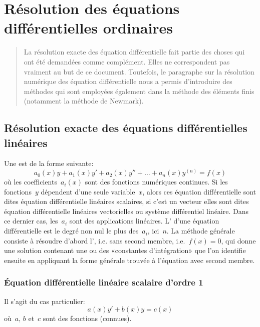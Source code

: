 \chapter{Résolution des équations différentielles ordinaires}\label{Ch-ED} 

\begin{abstract}
La résolution exacte des équation différentielle fait partie des choses qui ont été demandées comme complément. Elles ne correspondent pas vraiment au but de ce document. Toutefois, le paragraphe sur la résolution numérique des équation différentielle nous a permis d'introduire des méthodes qui sont employées également dans la méthode des éléments finis (notamment la méthode de Newmark). 
\end{abstract} 

\section{Résolution exacte des équations différentielles linéaires} 

Une  est de la forme suivante:
\begin{equation}
a_0(x) y + a_1(x) y' + a_2(x) y'' + \ldots + a_n(x) y^{(n)}= f(x)
\end{equation}
où les coefficients~$a_i(x)$ sont des fonctions numériques continues. Si les fonctions~$y$ dépendent d'une seule variable~$x$, alors ces équation différentielle sont dites équation différentielle linéaires scalaires, si c'est un vecteur elles sont dites équation différentielle linéaires vectorielles ou système différentiel linéaire. Dans ce dernier cas, les~$a_i$ sont des applications linéaires. L' d'une équation différentielle est le degré non nul le plus des~$a_i$, ici~$n$. 
La méthode générale consiste à résoudre d'abord l', i.e. sans second membre, i.e.~$f(x)=0$, qui donne une solution contenant une ou des «constantes d'intégration» que l'on identifie ensuite en appliquant la forme générale trouvée à l'équation avec second membre. 
 
\medskip
\subsection{Équation différentielle linéaire scalaire d'ordre 1} 

Il s'agit du cas particulier:
\begin{equation}
a(x)y' + b(x)y = c(x)
\end{equation}
où~$a$, $b$ et~$c$ sont des fonctions (connues). 

